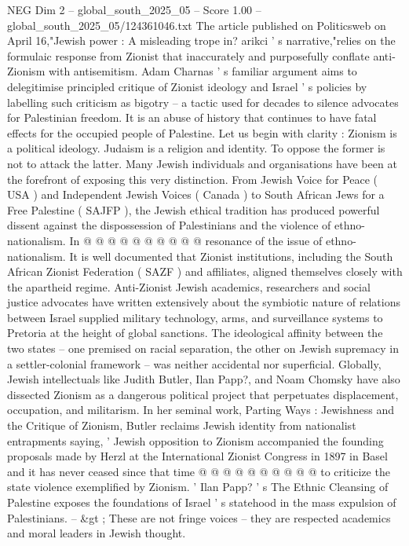 \begin{textsample}{NEG Dim 2 – global\_south\_2025\_05 – Score 1.00 – global\_south\_2025\_05/124361046.txt}  \label{ex:f2_neg_148}
The article published on Politicsweb on April 16,"Jewish power : A misleading trope in? arikci ' s narrative,"relies on the formulaic response from Zionist that inaccurately and purposefully conflate anti-Zionism with antisemitism.
Adam Charnas ' s familiar argument aims to delegitimise principled critique of Zionist ideology and Israel ' s policies by labelling such criticism as bigotry -- a tactic used for decades to silence advocates for Palestinian freedom.
It is an abuse of history that continues to have fatal effects for the occupied people of Palestine.
Let us begin with clarity : Zionism is a political ideology.
Judaism is a religion and identity.
To oppose the former is not to attack the latter.
Many Jewish individuals and organisations have been at the forefront of exposing this very distinction.
From Jewish Voice for Peace ( USA ) and Independent Jewish Voices ( Canada ) to South African Jews for a Free Palestine ( SAJFP ), the Jewish ethical tradition has produced powerful dissent against the dispossession of Palestinians and the violence of ethno-nationalism.
In @ @ @ @ @ @ @ @ @ @ resonance of the issue of ethno-nationalism.
It is well documented that Zionist institutions, including the South African Zionist Federation ( SAZF ) and affiliates, aligned themselves closely with the apartheid regime.
Anti-Zionist Jewish academics, researchers and social justice advocates have written extensively about the symbiotic nature of relations between Israel supplied military technology, arms, and surveillance systems to Pretoria at the height of global sanctions.
The ideological affinity between the two states -- one premised on racial separation, the other on Jewish supremacy in a settler-colonial framework -- was neither accidental nor superficial.
Globally, Jewish intellectuals like Judith Butler, Ilan Papp?, and Noam Chomsky have also dissected Zionism as a dangerous political project that perpetuates displacement, occupation, and militarism.
In her seminal work, Parting Ways : Jewishness and the Critique of Zionism, Butler reclaims Jewish identity from nationalist entrapments saying, ' Jewish opposition to Zionism accompanied the founding proposals made by Herzl at the International Zionist Congress in 1897 in Basel and it has never ceased since that time @ @ @ @ @ @ @ @ @ @ to criticize the state violence exemplified by Zionism. ' Ilan Papp? ' s The Ethnic Cleansing of Palestine exposes the foundations of Israel ' s statehood in the mass expulsion of Palestinians. -- \&gt ; These are not fringe voices -- they are respected academics and moral leaders in Jewish thought.

\end{textsample}
